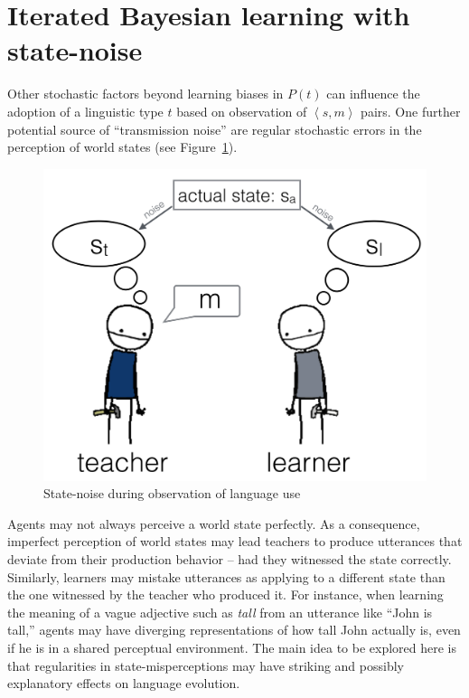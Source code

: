 \documentclass[10pt,a4paper]{article}
\newcommand{\tuple}[1]{\ensuremath{\left\langle #1 \right\rangle}}
\begin{document}
\section{Iterated Bayesian learning with state-noise}

Other stochastic factors beyond learning biases in $P(t)$ can influence the adoption of a
linguistic type $t$ based on observation of $\tuple{s,m}$ pairs. One further potential source
of ``transmission noise'' are regular stochastic errors in the perception of world states (see
Figure~\ref{fig:cartoon}).
%
\begin{figure}[t]
  \centering
  \includegraphics[width = 0.75\linewidth]{pics/cartoon_picture.png}
  \caption{State-noise during observation of language use}
  \label{fig:cartoon}
\end{figure}
% 
Agents may not always perceive a world state perfectly. As a consequence, imperfect perception of world states
may lead teachers to produce utterances that deviate from their production behavior -- had they
witnessed the state correctly. Similarly, learners may mistake utterances as applying to a
different state than the one witnessed by the teacher who produced it. For instance, when learning the meaning of a vague adjective
such as {\em tall} from an utterance like ``John is tall,'' agents may have diverging
representations of how tall John actually is, even if he is in a shared perceptual
environment. The main idea to be explored here is that regularities in state-misperceptions may
have striking and possibly explanatory effects on language evolution. 
\end{document}
